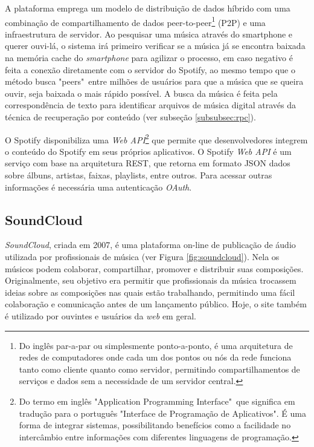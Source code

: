 A plataforma emprega um modelo de distribuição de dados híbrido com uma combinação de compartilhamento de dados peer-to-peer\footnote{Do inglês par-a-par ou simplesmente ponto-a-ponto, é uma arquitetura de redes de computadores onde cada um dos pontos ou nós da rede funciona tanto como cliente quanto como servidor, permitindo compartilhamentos de serviços e dados sem a necessidade de um servidor central.} (P2P) e uma infraestrutura de servidor. Ao pesquisar uma música através do smartphone e querer ouvi-lá, o sistema irá primeiro verificar se a música já se encontra baixada na memória cache do \textit{smartphone} para agilizar o processo, em caso negativo é feita a conexão diretamente com o servidor do Spotify, ao mesmo tempo que o método busca "peers"\ entre milhões de usuários para que a música que se queira ouvir, seja baixada o mais rápido possível. A busca da música é feita pela correspondência de texto para identificar arquivos de música digital através da técnica de recuperação por conteúdo (ver subseção \ref{subsubsec:rpc}).

O Spotify disponibiliza uma \textit{Web API}\footnote{Do termo em inglês "Application Programming Interface"\ que significa em tradução para o português "Interface de Programação de Aplicativos". É uma forma de integrar sistemas, possibilitando benefícios como a facilidade no intercâmbio entre informações com diferentes linguagens de programação.} que permite que desenvolvedores integrem o conteúdo do Spotify em seus próprios aplicativos. O Spotify \textit{Web API} é um serviço com base na arquitetura REST, que retorna em formato JSON dados sobre álbuns, artistas, faixas, playlists, entre outros. Para acessar outras informações é necessária uma autenticação \textit{OAuth}.


\subsection{SoundCloud} \label{subsec:soundcloud}
\textit{SoundCloud}, criada em 2007, é uma plataforma on-line de publicação de áudio utilizada por profissionais de música (ver Figura \ref{fig:soundcloud}). Nela os músicos podem colaborar, compartilhar, promover e distribuir suas composições.
Originalmente, seu objetivo era permitir que profissionais da música trocassem ideias sobre as composições nas quais estão trabalhando, permitindo uma fácil colaboração e comunicação antes de um lançamento público. Hoje, o site também é utilizado por ouvintes e usuários da \textit{web} em geral.

